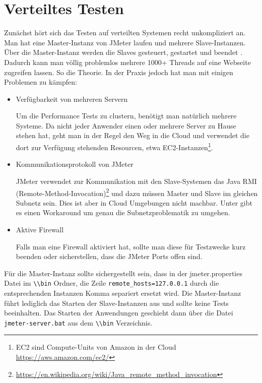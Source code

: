 \documentclass[a4paper,12pt]{article}
\newcommand{\codeInLine}[1]{%
\colorbox{graybackgroundColor}{\lstinline{#1}} %
}
\begin{document}
\section{Verteiltes Testen}
Zunächst hört sich das Testen auf verteilten Systemen recht unkompliziert an. Man hat eine Master-Instanz von JMeter laufen und mehrere Slave-Instanzen. Über die Master-Instanz werden die Slaves gesteuert, gestartet und beendet \cite{online:jmetercloud}. Dadurch kann man völlig problemlos mehrere 1000+ Threads auf eine Webseite zugreifen lassen.
So die Theorie. In der Praxis jedoch hat man mit einigen Problemen zu kämpfen:
\begin{itemize}
  \item Verfügbarkeit von mehreren Servern
	
	Um die Performance Tests zu clustern, benötigt man natürlich mehrere Systeme. Da nicht jeder Anwender einen oder mehrere Server zu Hause stehen hat, geht man in der Regel den Weg in die Cloud und verwendet die dort zur Verfügung stehenden Resourcen, etwa EC2-Instanzen\footnote{EC2 sind Compute-Units von Amazon in der Cloud \url{https://aws.amazon.com/ec2/}}.
  \item Kommunikationsprotokoll von JMeter
	
	JMeter verwendet zur Kommunikation mit den Slave-Systemen das Java RMI (Remote-Method-Invocation)\footnote{\url{https://en.wikipedia.org/wiki/Java_remote_method_invocation}} und dazu müssen Master und Slave im gleichen Subnetz sein. Dies ist aber in Cloud Umgebungen nicht machbar. Unter \cite{online:jmetercloud} gibt es einen Workaround um genau die Subnetzproblematik zu umgehen. 

	\item Aktive Firewall
	
	Falls man eine Firewall aktiviert hat, sollte man diese für Testzwecke kurz beenden oder sicherstellen, dass die JMeter Ports offen sind. 
\end{itemize}

Für die Master-Instanz sollte sichergestellt sein, dass in der jmeter.properties Datei im \codeInLine{\\bin} Ordner, die Zeile \codeInLine{remote_hosts=127.0.0.1} durch die entsprechenden Instanzen Komma separiert ersetzt wird. Die Master-Instanz führt lediglich das Starten der Slave-Instanzen aus und sollte keine Tests beeinhalten. Das Starten der Anwendungen geschieht dann über die Datei \codeInLine{jmeter-server.bat} aus dem \codeInLine{\\bin} Verzeichnis.
\end{document}
